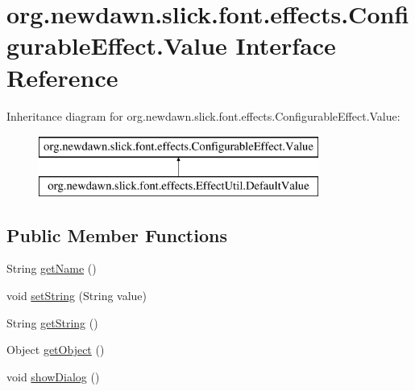 \hypertarget{interfaceorg_1_1newdawn_1_1slick_1_1font_1_1effects_1_1_configurable_effect_1_1_value}{}\section{org.\+newdawn.\+slick.\+font.\+effects.\+Configurable\+Effect.\+Value Interface Reference}
\label{interfaceorg_1_1newdawn_1_1slick_1_1font_1_1effects_1_1_configurable_effect_1_1_value}
Inheritance diagram for org.\+newdawn.\+slick.\+font.\+effects.\+Configurable\+Effect.\+Value\+:\begin{figure}[H]
\begin{center}
\leavevmode
\includegraphics[height=2.000000cm]{interfaceorg_1_1newdawn_1_1slick_1_1font_1_1effects_1_1_configurable_effect_1_1_value}
\end{center}
\end{figure}
\subsection*{Public Member Functions}
\begin{DoxyCompactItemize}
\item 
String \mbox{\hyperlink{interfaceorg_1_1newdawn_1_1slick_1_1font_1_1effects_1_1_configurable_effect_1_1_value_afa269488801c0c0f4edc106453186629}{get\+Name}} ()
\item 
void \mbox{\hyperlink{interfaceorg_1_1newdawn_1_1slick_1_1font_1_1effects_1_1_configurable_effect_1_1_value_a124f421b2240f17756a9256b82d315a5}{set\+String}} (String value)
\item 
String \mbox{\hyperlink{interfaceorg_1_1newdawn_1_1slick_1_1font_1_1effects_1_1_configurable_effect_1_1_value_a08be303b8f3992da862325722d0b234f}{get\+String}} ()
\item 
Object \mbox{\hyperlink{interfaceorg_1_1newdawn_1_1slick_1_1font_1_1effects_1_1_configurable_effect_1_1_value_a1475e6e873dfe40f17711e402228c77d}{get\+Object}} ()
\item 
void \mbox{\hyperlink{interfaceorg_1_1newdawn_1_1slick_1_1font_1_1effects_1_1_configurable_effect_1_1_value_af72521e4470795830ee1fa887b4587fa}{show\+Dialog}} ()
\end{DoxyCompactItemize}


